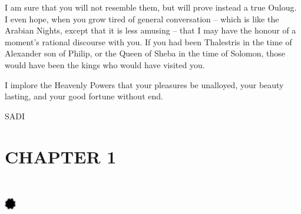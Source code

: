 \documentclass{article}
\begin{document}
\begin{center}
I am sure that you will not resemble them, but will prove instead a true Ouloug. 
I even hope, when you grow tired of general conversation – which is like the 
Arabian Nights, except that it is less amusing – that I may have the honour of 
a moment's rational discourse with you. If you had been Thalestris in the time 
of Alexander son of Philip, or the Queen of Sheba in the time of Solomon, those 
would have been the kings who would have visited you. 

I implore the Heavenly Powers that your pleasures be unalloyed, your beauty lasting, 
and your good fortune without end.

\begin{flushright}
SADI\pagebreak{} 
\end{flushright}

\section*{\textbf{CHAPTER 1  }}

\section*{%
\includegraphics[width=14pt, height=15pt, keepaspectratio=true]{Zadig or L'Ingenu - Voltaire-fig004.jpg}
}

 


\end{center}
\end{document}
